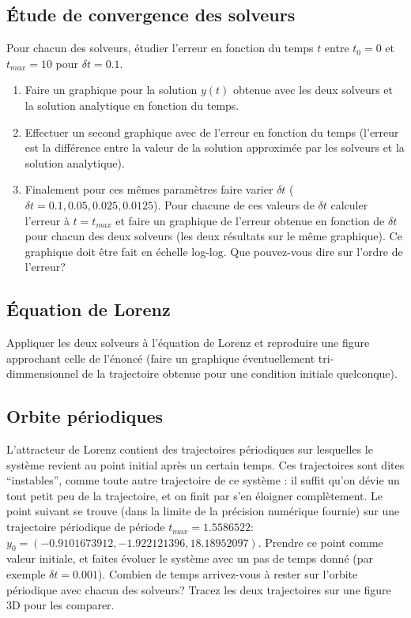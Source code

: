 \documentclass[a4paper,10pt]{article}
\begin{document}
\subsection*{Étude de convergence des solveurs}

Pour chacun des solveurs, étudier l'erreur en fonction du temps $t$ entre $t_0=0$ et $t_{max}=10$ pour $\delta t=0.1$. 
\begin{enumerate}
\item Faire un graphique 
pour la solution $y(t)$ obtenue avec les deux solveurs et la solution analytique en fonction du temps. 
\item Effectuer un second graphique avec de l'erreur en fonction du temps (l'erreur est la différence entre la valeur de la solution approximée par les solveurs et la solution analytique).
\item Finalement pour ces mêmes paramètres faire varier $\delta t$ ($\delta t=0.1,0.05, 0.025, 0.0125$). Pour chacune de ces valeurs de $\delta t$ calculer l'erreur à $t=t_{max}$
et faire un graphique de l'erreur obtenue en fonction de $\delta t$ pour chacun des deux solveurs (les deux résultats sur le même graphique).
Ce graphique doit être fait en échelle log-log. Que pouvez-vous dire sur l'ordre de l'erreur?
\end{enumerate}

\subsection*{Équation de Lorenz}

Appliquer les deux solveurs à l'équation de Lorenz et reproduire une figure approchant celle de l'énoncé (faire un graphique éventuellement tri-dimmensionnel de la trajectoire obtenue
pour une condition initiale quelconque).

\subsection*{Orbite périodiques}

L’attracteur de Lorenz contient des trajectoires périodiques sur lesquelles
le système revient au point initial après un certain temps. Ces trajectoires sont dites
``instables'', comme toute autre trajectoire de ce système : il suffit qu’on dévie un
tout petit peu de la trajectoire, et on finit par s’en éloigner complètement. Le
point suivant se trouve (dans la limite de la précision numérique fournie) sur
une trajectoire périodique de période $t_{max}=1.5586522$:
$y_0=(-0.9101673912,-1.922121396,18.18952097)$.
Prendre ce point comme valeur initiale, et faites évoluer le système avec un pas de
temps donné (par exemple $\delta t = 0.001$). Combien de temps arrivez-vous à rester
sur l’orbite périodique avec chacun des solveurs?
Tracez les deux trajectoires sur une figure 3D pour les comparer.
\end{document}
